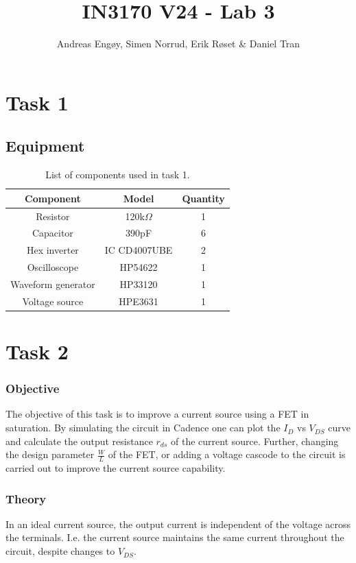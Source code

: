 \documentclass[onecolumn]{article}
\title{IN3170 V24 - Lab 3}
\author{Andreas Engøy, Simen Norrud, Erik Røset \& Daniel Tran}
\date{\monthname[\the\month] \the\year}
\begin{document}
\maketitle


\section{Task 1}
\subsection{Equipment}
\begin{table}[h]
    \centering
    \begin{tabular}{|c|c|c|}
        \hline
        \textbf{Component} & \textbf{Model} & \textbf{Quantity} \\
        \hline
        Resistor & 120k$\Omega$ & 1 \\
        Capacitor & 390pF & 6 \\
        Hex inverter & IC CD4007UBE & 2 \\
        Oscilloscope & HP54622 & 1 \\
        Waveform generator  & HP33120 & 1\\
        Voltage source & HPE3631 & 1 \\
        \hline
    \end{tabular}
    \caption{List of components used in task 1.}
    \label{tab:bom}
\end{table}



\section{Task 2}

\subsubsection*{Objective}
The objective of this task is to improve a current source using a FET in saturation. By simulating the circuit in Cadence one can plot the $I_D$ vs $V_{DS}$ curve and calculate the output resistance $r_{ds}$ of the current source. Further, changing the design parameter $\frac{W}{L}$ of the FET, or adding a voltage cascode to the circuit is carried out to improve the current source capability.

\subsubsection*{Theory}
In an ideal current source, the output current is independent of the voltage across the terminals. I.e. the current source maintains the same current throughout the circuit, despite changes to $V_{DS}$.
\end{document}
